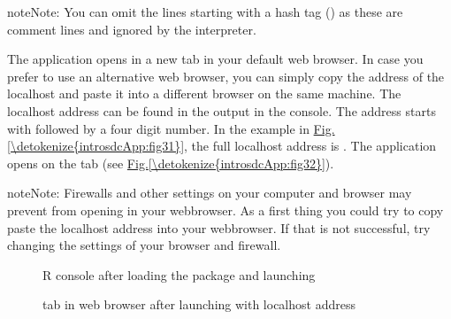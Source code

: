 \documentclass[letterpaper,10pt,english]{sphinxmanual}
\begin{document}
\begin{sphinxadmonition}{note}{Note:}
You can omit the lines starting with a hash tag (\sphinxcode{\sphinxupquote{\#}}) as these are comment lines
and ignored by the  interpreter.
\end{sphinxadmonition}

The application opens in a new tab in your default web browser. In case you prefer to use
an alternative web browser, you can simply copy the address of the localhost and paste it into
a different browser on the same machine. The localhost address can be
found in the output in the  console. The address starts with  followed
by a four digit number. In the example in \hyperref[\detokenize{introsdcApp:fig31}]{Fig.\@ \ref{\detokenize{introsdcApp:fig31}}}, the full localhost address is
. The application opens on the  tab (see \hyperref[\detokenize{introsdcApp:fig32}]{Fig.\@ \ref{\detokenize{introsdcApp:fig32}}}).

\begin{sphinxadmonition}{note}{Note:}
Firewalls and other settings on your computer and browser may prevent  from opening
in your webbrowser. As a first thing you could try to copy paste the localhost address
into your webbrowser. If that is not successful, try changing the settings of your
browser and firewall.
\end{sphinxadmonition}

\begin{figure}[htbp]
\centering
\capstart

\noindent{}
\caption{R console after loading the  package and launching }\label{\detokenize{introsdcApp:fig31}}\label{\detokenize{introsdcApp:id1}}\end{figure}

\begin{figure}[htbp]
\centering
\capstart

\noindent{}
\caption{ tab in web browser after launching  with localhost address}\label{\detokenize{introsdcApp:fig32}}\label{\detokenize{introsdcApp:id2}}\end{figure}
\end{document}
